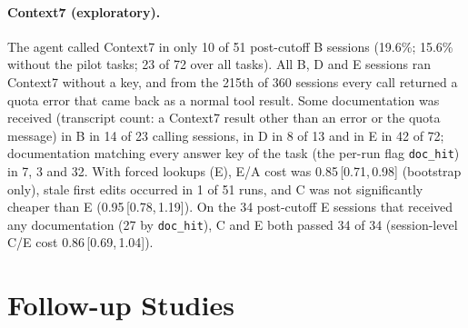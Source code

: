 \documentclass[11pt]{article}
\newcommand{\ci}[2]{\,[#1,\,#2]}
\newcommand{\code}[1]{\texttt{#1}}
\begin{document}
\paragraph{Context7 (exploratory).}
The agent called Context7 in only 10 of 51 post-cutoff B sessions (19.6\%; 15.6\% without the pilot tasks; 23 of 72 over all tasks). All B, D and E sessions ran Context7 without a key, and from the 215th of 360 sessions every call returned a quota error that came back as a normal tool result.
Some documentation was received (transcript count: a Context7 result other than an error or the quota message) in B in 14 of 23 calling sessions, in D in 8 of 13 and in E in 42 of 72; documentation matching every answer key of the task (the per-run flag \code{doc\_hit}) in 7, 3 and 32.
With forced lookups (E), E/A cost was 0.85\ci{0.71}{0.98} (bootstrap only), stale first edits occurred in 1 of 51 runs, and C was not significantly cheaper than E (0.95\ci{0.78}{1.19}).
On the 34 post-cutoff E sessions that received any documentation (27 by \code{doc\_hit}), C and E both passed 34 of 34 (session-level C/E cost 0.86\ci{0.69}{1.04}).

\section{Follow-up Studies}
\label{app:followup}
\end{document}
